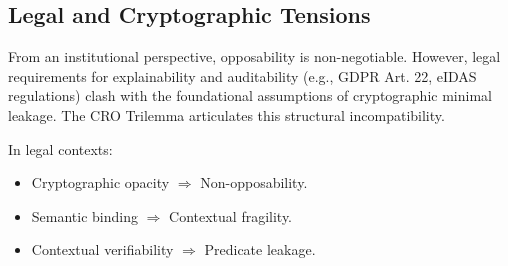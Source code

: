 \documentclass[preprint,12pt]{elsarticle}
\begin{document}
        \subsection{Legal and Cryptographic Tensions}

            From an institutional perspective, opposability is non-negotiable. However, legal requirements for explainability and auditability (e.g., GDPR Art. 22, eIDAS regulations) clash with the foundational assumptions of cryptographic minimal leakage. The CRO Trilemma articulates this structural incompatibility.

            In legal contexts:
            \begin{itemize}
                \item Cryptographic opacity $\Rightarrow$ Non-opposability.
                \item Semantic binding $\Rightarrow$ Contextual fragility.
                \item Contextual verifiability $\Rightarrow$ Predicate leakage.
            \end{itemize}
\end{document}
